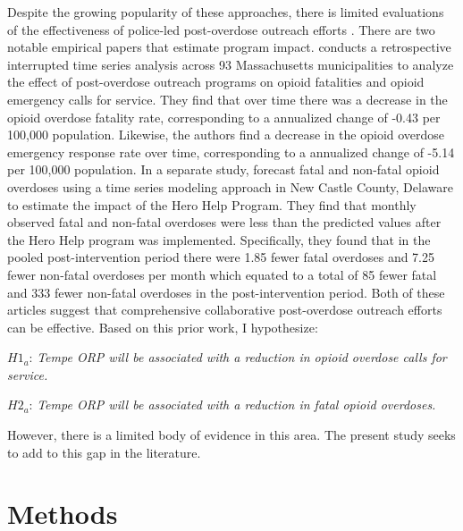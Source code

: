 Despite the growing popularity of these approaches, there is limited evaluations of the effectiveness of police-led post-overdose outreach efforts \parencite{bailey_scoping_2023, yatsco_developing_2020}. There are two notable empirical papers that estimate program impact. \textcite{xuan_association_2023} conducts a retrospective interrupted time series analysis across 93 Massachusetts municipalities to analyze the effect of post-overdose outreach programs on opioid fatalities and opioid emergency calls for service. They find that over time there was a decrease in the opioid overdose fatality rate, corresponding to a annualized change of -0.43 per 100,000 population. Likewise, the authors find a decrease in the opioid overdose emergency response rate over time, corresponding to a annualized change of -5.14 per 100,000 population. In a separate study, \textcite{donnelly_law_2022} forecast fatal and non-fatal opioid overdoses using a time series modeling approach in New Castle County, Delaware to estimate the impact of the Hero Help Program. They find that monthly observed fatal and non-fatal overdoses were less than the predicted values after the Hero Help program was implemented. Specifically, they found that in the pooled post-intervention period there were 1.85 fewer fatal overdoses and 7.25 fewer non-fatal overdoses per month which equated to a total of 85 fewer fatal and 333 fewer non-fatal overdoses in the post-intervention period. Both of these articles suggest that comprehensive collaborative post-overdose outreach efforts can be effective. Based on this prior work, I hypothesize: 

\begin{flushleft}
\(H1_a\): \textit{Tempe ORP will be associated with a reduction in opioid overdose calls for service.}
\end{flushleft}

\begin{flushleft}
\(H2_a\): \textit{Tempe ORP will be associated with a reduction in fatal opioid overdoses.}
\end{flushleft}

\noindent However, there is a limited body of evidence in this area. The present study seeks to add to this gap in the literature.

\section{\centering Methods}
